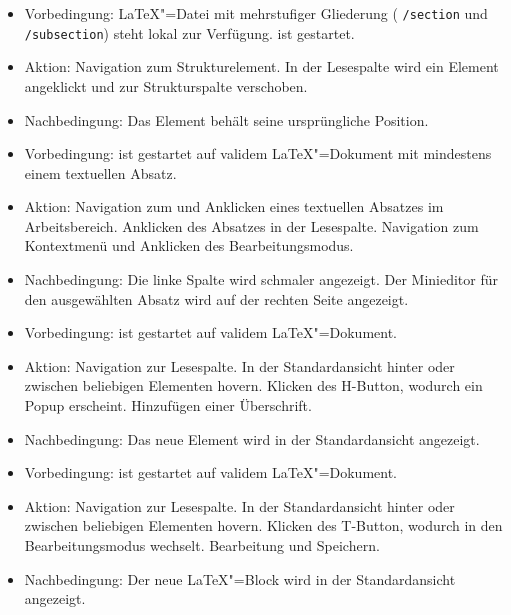 \begin{itemize}
  \item Vorbedingung: \LaTeX"=Datei mit mehrstufiger Gliederung (\zB{} \verb|/section| und \verb|/subsection|) steht
  lokal zur Verfügung.
  \texla{} ist gestartet.
  \item Aktion: Navigation zum Strukturelement.
  In der Lesespalte wird ein Element angeklickt und zur Strukturspalte verschoben.
  \item Nachbedingung: Das Element behält seine ursprüngliche Position.
\end{itemize}

\begin{itemize}
  \item Vorbedingung: \texla{} ist gestartet auf validem \LaTeX"=Dokument mit mindestens einem textuellen Absatz.
  \item Aktion: Navigation zum und Anklicken eines textuellen Absatzes im Arbeitsbereich.
  Anklicken des Absatzes in der Lesespalte.
  Navigation zum Kontextmenü und Anklicken des Bearbeitungsmodus.
  \item Nachbedingung: Die linke Spalte wird schmaler angezeigt.
  Der Minieditor für den ausgewählten Absatz wird auf der rechten Seite angezeigt.
\end{itemize}

\clearpage

\begin{itemize}
  \item Vorbedingung: \texla{} ist gestartet auf validem \LaTeX"=Dokument.
  \item Aktion: Navigation zur Lesespalte.
  In der Standardansicht hinter oder zwischen beliebigen Elementen hovern.
  Klicken des H-Button, wodurch ein Popup erscheint.
  Hinzufügen einer Überschrift.
  \item Nachbedingung: Das neue Element wird in der Standardansicht angezeigt.
\end{itemize}

\begin{itemize}
  \item Vorbedingung: \texla{} ist gestartet auf validem \LaTeX"=Dokument.
  \item Aktion: Navigation zur Lesespalte.
  In der Standardansicht hinter oder zwischen beliebigen Elementen hovern.
  Klicken des T-Button, wodurch \texla{} in den Bearbeitungsmodus wechselt.
  Bearbeitung und Speichern.
  \item Nachbedingung: Der neue \LaTeX"=Block wird in der Standardansicht angezeigt.
\end{itemize}

